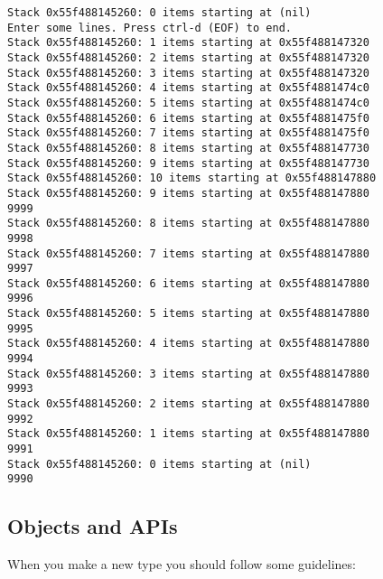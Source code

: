 \documentclass[11pt]{article}
\begin{document}
\begin{verbatim}
Stack 0x55f488145260: 0 items starting at (nil)
Enter some lines. Press ctrl-d (EOF) to end.
Stack 0x55f488145260: 1 items starting at 0x55f488147320
Stack 0x55f488145260: 2 items starting at 0x55f488147320
Stack 0x55f488145260: 3 items starting at 0x55f488147320
Stack 0x55f488145260: 4 items starting at 0x55f4881474c0
Stack 0x55f488145260: 5 items starting at 0x55f4881474c0
Stack 0x55f488145260: 6 items starting at 0x55f4881475f0
Stack 0x55f488145260: 7 items starting at 0x55f4881475f0
Stack 0x55f488145260: 8 items starting at 0x55f488147730
Stack 0x55f488145260: 9 items starting at 0x55f488147730
Stack 0x55f488145260: 10 items starting at 0x55f488147880
Stack 0x55f488145260: 9 items starting at 0x55f488147880
9999
Stack 0x55f488145260: 8 items starting at 0x55f488147880
9998
Stack 0x55f488145260: 7 items starting at 0x55f488147880
9997
Stack 0x55f488145260: 6 items starting at 0x55f488147880
9996
Stack 0x55f488145260: 5 items starting at 0x55f488147880
9995
Stack 0x55f488145260: 4 items starting at 0x55f488147880
9994
Stack 0x55f488145260: 3 items starting at 0x55f488147880
9993
Stack 0x55f488145260: 2 items starting at 0x55f488147880
9992
Stack 0x55f488145260: 1 items starting at 0x55f488147880
9991
Stack 0x55f488145260: 0 items starting at (nil)
9990
\end{verbatim}

\subsection{Objects and APIs}
\label{sec:org67236fa}

When you make a new type you should follow some guidelines:
\end{document}
